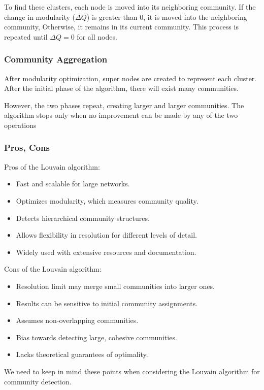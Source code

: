 To find these clusters, each node is moved into its neighboring community. If the change in modularity ($\Delta Q$) is greater than 0, it is moved into the neighboring community, Otherwise, it remains in its current community. This process is repeated until $\Delta Q=0$ for all nodes.
\subsubsection{Community Aggregation}
After modularity optimization, super nodes are created to represent each cluster. After the initial phase of the algorithm, there will exist many communities.

However, the two phases repeat, creating larger and larger communities. The algorithm stops only when no improvement can be made by any of the two operations 
\subsubsection{Pros, Cons}
Pros of the Louvain algorithm:
\begin{itemize}
    \item Fast and scalable for large networks.
    \item Optimizes modularity, which measures community quality.
    \item Detects hierarchical community structures.
    \item Allows flexibility in resolution for different levels of detail.
    \item Widely used with extensive resources and documentation.
\end{itemize}

Cons of the Louvain algorithm:
\begin{itemize}
    \item Resolution limit may merge small communities into larger ones.
    \item Results can be sensitive to initial community assignments.
    \item Assumes non-overlapping communities.
    \item Bias towards detecting large, cohesive communities.
    \item Lacks theoretical guarantees of optimality.
\end{itemize}

We need to keep in mind these points when considering the Louvain algorithm for community detection.

